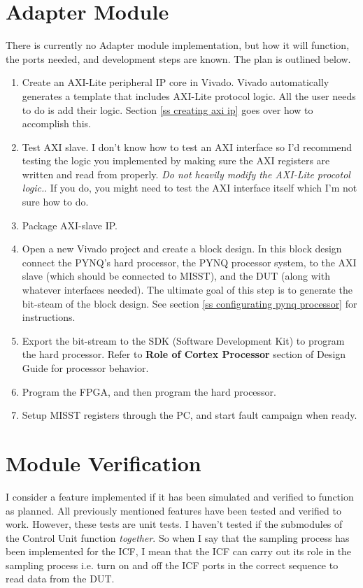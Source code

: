 \documentclass[]{report}
\begin{document}
\section{Adapter Module}
There is currently no Adapter module implementation, but how it will function, the ports needed, and development steps are known. The plan is outlined below.
\begin{enumerate}
	\item Create an AXI-Lite peripheral IP core in Vivado. Vivado automatically generates a template that includes AXI-Lite protocol logic. All the user needs to do is add their logic. Section \ref{ss creating axi ip} goes over how to accomplish this.
	\item Test AXI slave. I don't know how to test an AXI interface so I'd recommend testing the logic you implemented by making sure the AXI registers are written and read from properly. \textit{Do not heavily modify the AXI-Lite procotol logic.}. If you do, you might need to test the AXI interface itself which I'm not sure how to do.
	\item Package AXI-slave IP.
	\item Open a new Vivado project and create a block design. In this block design connect the PYNQ's hard processor, the PYNQ processor system, to the AXI slave (which should be connected to MISST), and the DUT (along with whatever interfaces needed). The ultimate goal of this step is to generate the bit-steam of the block design. See section \ref{ss configurating pynq processor} for instructions.
	\item  Export the bit-stream to the SDK (Software Development Kit) to program the hard processor. Refer to \textbf{Role of Cortex Processor} section of Design Guide for processor behavior.
	\item Program the FPGA, and then program the hard processor. 
	\item Setup MISST registers through the PC, and start fault campaign when ready.
\end{enumerate}

\section{Module Verification}

I consider a feature implemented if it has been simulated and verified to function as planned. All previously mentioned features have been tested and verified to work. However, these tests are unit tests. I haven't tested if the submodules of the Control Unit function \textit{together}. So when I say that the sampling process has been implemented for the ICF, I mean that the ICF can carry out its role in the sampling process i.e. turn on and off the ICF ports in the correct sequence to read data from the DUT. 
\end{document}
